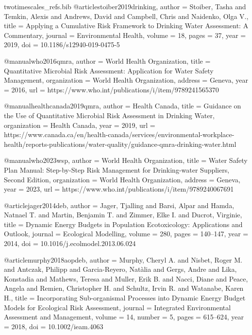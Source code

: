 \begin{filecontents*}{twotimescales_refs.bib}
@article{stoiber2019drinking,
  author  = {Stoiber, Tasha and Temkin, Alexis and Andrews, David and Campbell, Chris and Naidenko, Olga V.},
  title   = {Applying a Cumulative Risk Framework to Drinking Water Assessment: A Commentary},
  journal = {Environmental Health},
  volume  = {18},
  pages   = {37},
  year    = {2019},
  doi     = {10.1186/s12940-019-0475-5}
}

@manual{who2016qmra,
  author       = {{World Health Organization}},
  title        = {Quantitative Microbial Risk Assessment: Application for Water Safety Management},
  organization = {World Health Organization},
  address      = {Geneva},
  year         = {2016},
  url          = {https://www.who.int/publications/i/item/9789241565370}
}

@manual{healthcanada2019qmra,
  author       = {{Health Canada}},
  title        = {Guidance on the Use of Quantitative Microbial Risk Assessment in Drinking Water},
  organization = {Health Canada},
  year         = {2019},
  url          = {https://www.canada.ca/en/health-canada/services/environmental-workplace-health/reports-publications/water-quality/guidance-qmra-drinking-water.html}
}

@manual{who2023wsp,
  author       = {{World Health Organization}},
  title        = {Water Safety Plan Manual: Step-by-Step Risk Management for Drinking-water Suppliers, Second Edition},
  organization = {World Health Organization},
  address      = {Geneva},
  year         = {2023},
  url          = {https://www.who.int/publications/i/item/9789240067691}
}

@article{jager2014deb,
  author  = {Jager, Tjalling and Barsi, Alpar and Hamda, Natnael T. and Martin, Benjamin T. and Zimmer, Elke I. and Ducrot, Virginie},
  title   = {Dynamic Energy Budgets in Population Ecotoxicology: Applications and Outlook},
  journal = {Ecological Modelling},
  volume  = {280},
  pages   = {140--147},
  year    = {2014},
  doi     = {10.1016/j.ecolmodel.2013.06.024}
}

@article{murphy2018aopdeb,
  author  = {Murphy, Cheryl A. and Nisbet, Roger M. and Antczak, Philipp and Garcia-Reyero, Nat{\`a}lia and Gergs, Andre and Lika, Konstadia and Mathews, Teresa and Muller, Erik B. and Nacci, Diane and Peace, Angela and Remien, Christopher H. and Schultz, Irvin R. and Watanabe, Karen H.},
  title   = {Incorporating Sub-organismal Processes into Dynamic Energy Budget Models for Ecological Risk Assessment},
  journal = {Integrated Environmental Assessment and Management},
  volume  = {14},
  number  = {5},
  pages   = {615--624},
  year    = {2018},
  doi     = {10.1002/ieam.4063}
}


\end{filecontents*}
